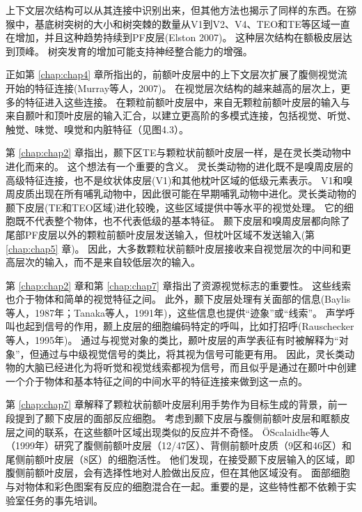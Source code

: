 上下文层次结构可以从其连接中识别出来，但其他方法也揭示了同样的东西。在猕猴中，基底树突树的大小和树突棘的数量从V1到V2、V4、TEO和TE等区域一直在增加，并且这种趋势持续到PF皮层(Elston 2007)。
这种层次结构在额极皮层达到顶峰。
树突发育的增加可能支持神经整合能力的增强。
\par


正如第 \ref{chap:chap4} 章所指出的，前额叶皮层中的上下文层次扩展了腹侧视觉流开始的特征连接(Murray等人，2007)。
在视觉层次结构的越来越高的层次上，更多的特征进入这些连接。
在颗粒前额叶皮层中，来自无颗粒前额叶皮层的输入与来自颞叶和顶叶皮层的输入汇合，以建立更高阶的多模式连接，包括视觉、听觉、触觉、味觉、嗅觉和内脏特征（见图4.3）。
\par


第 \ref{chap:chap2} 章指出，颞下区TE与颗粒状前额叶皮层一样，是在灵长类动物中进化而来的。
这个想法有一个重要的含义。
灵长类动物的进化既不是嗅周皮层的高级特征连接，也不是纹状体皮层(V1)和其他枕叶区域的低级元素表示。
V1和嗅周皮质出现在所有哺乳动物中，因此很可能在早期哺乳动物中进化。灵长类动物的颞下皮层(TE和TEO区域)进化较晚，这些区域提供中等水平的视觉处理。
它的细胞既不代表整个物体，也不代表低级的基本特征。
颞下皮层和嗅周皮层都向除了尾部PF皮层以外的颗粒前额叶皮层发送输入，但枕叶区域不发送输入(第 \ref{chap:chap5} 章)。
因此，大多数颗粒状前额叶皮层接收来自视觉层次的中间和更高层次的输入，而不是来自较低层次的输入。
\par


第 \ref{chap:chap2} 章和第 \ref{chap:chap7} 章指出了资源视觉标志的重要性。
这些线索也介于物体和简单的视觉特征之间。
此外，颞下皮层处理有关面部的信息(Baylis等人，1987年；Tanaka等人，1991年)，这些信息也提供“迹象”或“线索”。
声学呼叫也起到信号的作用，颞上皮层的细胞编码特定的呼叫，比如打招呼(Rauschecker等人，1995年)。
通过与视觉对象的类比，颞叶皮层的声学表征有时被解释为“对象”，但通过与中级视觉信号的类比，将其视为信号可能更有用。
因此，灵长类动物的大脑已经进化为将听觉和视觉线索都视为信号，而且似乎是通过在颞叶中创建一个介于物体和基本特征之间的中间水平的特征连接来做到这一点的。
\par


第 \ref{chap:chap7} 章解释了颗粒状前额叶皮层利用手势作为目标生成的背景，前一段提到了颞下皮层的面部反应细胞。
考虑到颞下皮层与腹侧前额叶皮层和眶额皮层之间的联系，在这些额叶区域出现类似的反应并不奇怪。
ÖScalaidhe等人（1999年）研究了腹侧前额叶皮层（12/47区）、背侧前额叶皮质（9区和46区）和尾侧前额叶皮层（8区）的细胞活性。
他们发现，在接受颞下皮层输入的区域，即腹侧前额叶皮层，会有选择性地对人脸做出反应，但在其他区域没有。
面部细胞与对物体和彩色图案有反应的细胞混合在一起。重要的是，这些特性都不依赖于实验室任务的事先培训。
\par


